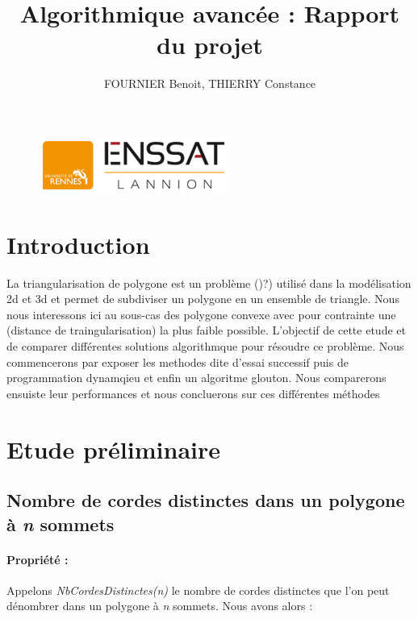 \documentclass[a4paper,10pt]{article}
\title{Algorithmique avancée : Rapport du projet}
\author{FOURNIER Benoit, THIERRY Constance}
\begin{document}
\maketitle

\begin{figure}[b]
\begin{center}
\includegraphics[scale=1]{Enssat.png}
\end{center}
\end{figure}

\thispagestyle{empty}

\newpage
\null
\thispagestyle{empty}
\newpage

\tableofcontents

\hfill

\listoffigures

\newpage
\null
\thispagestyle{empty}
\newpage

\section{Introduction}

La triangularisation de polygone est un problème ()?) 
utilisé dans la modélisation 2d et 3d et permet de subdiviser un polygone en un ensemble de triangle.
Nous nous interessons ici au sous-cas des polygone convexe avec pour contrainte une (distance de traingularisation) la plus faible possible.
L'objectif de cette etude et de comparer différentes solutions algorithmque pour résoudre ce problème.
Nous commencerons par exposer les methodes dite d'essai successif puis de programmation dynamqieu et enfin un algoritme glouton.
Nous comparerons ensuiste leur performances et nous concluerons sur ces différentes méthodes


\section{Etude préliminaire}

\subsection{Nombre de cordes distinctes dans un polygone à \emph{n} sommets}

\paragraph{Propriété :}
Appelons \emph{NbCordesDistinctes(n)} le nombre de cordes distinctes que l'on peut dénombrer dans un polygone à \emph{n} sommets.
Nous avons alors :
\end{document}
